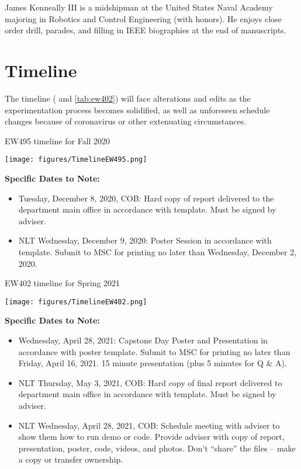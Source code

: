\documentclass[]{IEEEtran}
\begin{document}

\begin{IEEEbiography}{James Kenneally III} is a midshipman at the United States Naval Academy majoring in Robotics and Control Engineering (with honors). He enjoys close order drill, parades, and filling in IEEE biographies at the end of manuscripts.  
\end{IEEEbiography}


\appendices
\section{Timeline}
\label{app:A}
The timeline ( and \ref{tab:ew402}) will face alterations and edits as the experimentation process becomes solidified, as well as unforeseen schedule changes because of coronavirus or other extenuating circumstances.

\begin{table*}
\caption{EW495 timeline for Fall 2020}
\label{tab:ew495}
\begin{center}
\texttt{[image: figures/TimelineEW495.png]}
\end{center}
\noindent\textbf{Specific Dates to Note:}
\begin{itemize}
\item Tuesday, December 8, 2020, COB:  Hard copy of report delivered to the department main office in accordance with template. Must be signed by adviser. 
\item NLT Wednesday, December 9, 2020: Poster Session in accordance with template.  Submit to MSC for printing no later than Wednesday, December 2, 2020.
\end{itemize}
\end{table*}

\begin{table*}
\caption{EW402 timeline for Spring 2021}
\label{tab:ew402}
\begin{center}
\texttt{[image: figures/TimelineEW402.png]}
\end{center}
\noindent\textbf{Specific Dates to Note:}
\begin{itemize}
\item Wednesday, April 28, 2021:  Capstone Day Poster and Presentation in accordance with poster template.  Submit to MSC for printing no later than Friday, April 16, 2021.  15 minute presentation (plus 5 minutes for Q \& A). 
\item NLT Thursday, May 3, 2021, COB:  Hard copy of final report delivered to department main office in accordance with template. Must be signed by adviser. 
\item NLT Wednesday, April 28, 2021, COB:  Schedule meeting with adviser to show them how to run demo or code. Provide adviser with copy of report, presentation, poster, code, videos, and photos.   Don’t ``share'' the files -- make a copy or transfer ownership.  
\end{itemize}
\end{table*}
\end{document}
